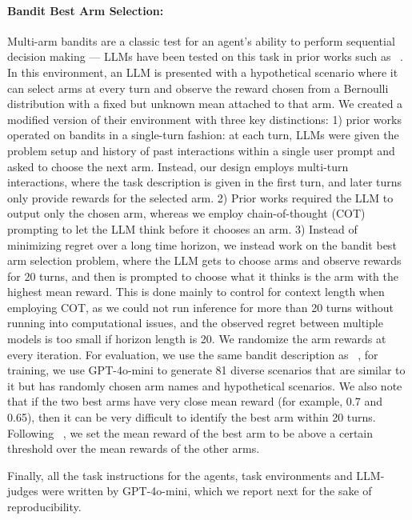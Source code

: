 \paragraph{Bandit Best Arm Selection: } Multi-arm bandits are a classic test for an agent's ability to perform sequential decision making --- LLMs have been tested on this task in prior works such as ~\citet{krishnamurthy2024largelanguagemodelsexplore,nie2024evolveevaluatingoptimizingllms}. In this environment, an LLM is presented with a hypothetical scenario where it can select arms at every turn and observe the reward chosen from a Bernoulli distribution with a fixed but unknown mean attached to that arm. We created a modified version of their environment with three key distinctions: 1) prior works operated on bandits in a single-turn fashion: at each turn, LLMs were given the problem setup and history of past interactions within a single user prompt and asked to choose the next arm. Instead, our design employs multi-turn interactions, where the task description is given in the first turn, and later turns only provide rewards for the selected arm. 2) Prior works required the LLM to output only the chosen arm, whereas we employ chain-of-thought (COT) prompting to let the LLM think before it chooses an arm. 3) Instead of minimizing regret over a long time horizon, we instead work on the bandit best arm selection problem, where the LLM gets to choose arms and observe rewards for 20 turns, and then is prompted to choose what it thinks is the arm with the highest mean reward. This is done mainly to control for context length when employing COT, as we could not run inference for more than 20 turns without running into computational issues, and the observed regret between multiple models is too small if horizon length is 20. We randomize the arm rewards at every iteration. For evaluation, we use the same bandit description as ~\citet{krishnamurthy2024largelanguagemodelsexplore}, for training, we use GPT-4o-mini to generate 81 diverse scenarios that are similar to it but has randomly chosen arm names and hypothetical scenarios. We also note that if the two best arms have very close mean reward (for example, 0.7 and 0.65), then it can be very difficult to identify the best arm within 20 turns. Following ~\citet{krishnamurthy2024largelanguagemodelsexplore,nie2024evolveevaluatingoptimizingllms}, we set the mean reward of the best arm to be above a certain threshold over the mean rewards of the other arms.

Finally, all the task instructions for the agents, task environments and LLM-judges were written by GPT-4o-mini, which we report next for the sake of reproducibility.

